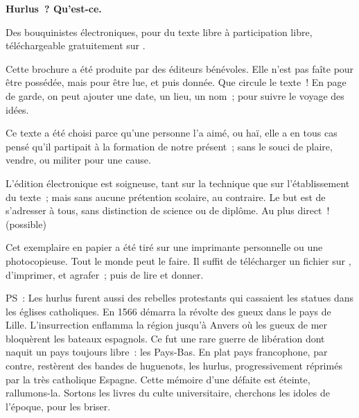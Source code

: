 \documentclass[french,twoside]{book} %
\newif\ifdev
\renewcommand{\LettrineFontHook}{\color{rubric}}
\newcommand{\initialiv}[2]{%
  \let\oldLFH\LettrineFontHook
  \IfSubStr{QJ’}{#1}{
    \lettrine[lines=4, lhang=0.2, loversize=-0.1, lraise=0.2]{\smash{#1}}{#2}
  }{\IfSubStr{É}{#1}{
    \lettrine[lines=4, lhang=0.2, loversize=-0, lraise=0]{\smash{#1}}{#2}
  }{\IfSubStr{ÀÂ}{#1}{
    \lettrine[lines=4, lhang=0.2, loversize=-0, lraise=0, slope=0.6em]{\smash{#1}}{#2}
  }{\IfSubStr{A}{#1}{
    \lettrine[lines=4, lhang=0.2, loversize=0.2, slope=0.6em]{\smash{#1}}{#2}
  }{\IfSubStr{V}{#1}{
    \lettrine[lines=4, lhang=0.2, loversize=0.2, slope=-0.5em]{\smash{#1}}{#2}
  }{
    \lettrine[lines=4, lhang=0.2, loversize=0.2]{\smash{#1}}{#2}
  }}}}}
  \let\LettrineFontHook\oldLFH
}
\renewcommand{\LettrineFontHook}{\bfseries\color{rubric}}
\begin{document}
  \hbox{}\newpage
  \ifodd\value{page}\hbox{}\newpage\fi
  {\centering\color{rubric}\bfseries\noindent\large
    Hurlus ? Qu’est-ce.\par
    \bigskip
  }
  \noindent Des bouquinistes électroniques, pour du texte libre à participation libre,
  téléchargeable gratuitement sur \href{https://hurlus.fr}{}.\par
  \bigskip
  \noindent Cette brochure a été produite par des éditeurs bénévoles.
  Elle n’est pas faîte pour être possédée, mais pour être lue, et puis donnée.
  Que circule le texte !
  En page de garde, on peut ajouter une date, un lieu, un nom ; pour suivre le voyage des idées.
  \par

  Ce texte a été choisi parce qu’une personne l’a aimé,
  ou haï, elle a en tous cas pensé qu’il partipait à la formation de notre présent ;
  sans le souci de plaire, vendre, ou militer pour une cause.
  \par

  L’édition électronique est soigneuse, tant sur la technique
  que sur l’établissement du texte ; mais sans aucune prétention scolaire, au contraire.
  Le but est de s’adresser à tous, sans distinction de science ou de diplôme.
  Au plus direct ! (possible)
  \par

  Cet exemplaire en papier a été tiré sur une imprimante personnelle
   ou une photocopieuse. Tout le monde peut le faire.
  Il suffit de
  télécharger un fichier sur \href{https://hurlus.fr}{},
  d’imprimer, et agrafer ; puis de lire et donner.\par

  \bigskip

  \noindent PS : Les hurlus furent aussi des rebelles protestants qui cassaient les statues dans les églises catholiques. En 1566 démarra la révolte des gueux dans le pays de Lille. L’insurrection enflamma la région jusqu’à Anvers où les gueux de mer bloquèrent les bateaux espagnols.
  Ce fut une rare guerre de libération dont naquit un pays toujours libre : les Pays-Bas.
  En plat pays francophone, par contre, restèrent des bandes de huguenots, les hurlus, progressivement réprimés par la très catholique Espagne.
  Cette mémoire d’une défaite est éteinte, rallumons-la. Sortons les livres du culte universitaire, cherchons les idoles de l’époque, pour les briser.
\fi

\ifdev %
\fontname\font — \textsc{Les règles du jeu}\par
(\hyperref[utopie]{\underline{Lien}})\par
\noindent \initialiv{A}{lors là}\blindtext\par
\noindent \initialiv{À}{ la bonheur des dames}\blindtext\par
\noindent \initialiv{É}{tonnez-le}\blindtext\par
\noindent \initialiv{Q}{ualitativement}\blindtext\par
\noindent \initialiv{V}{aloriser}\blindtext\par
\Blindtext
\phantomsection
\label{utopie}
\Blinddocument
\fi
\end{document}
